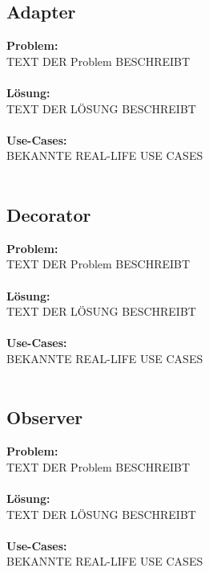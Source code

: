\documentclass[../main.tex]{subfiles}
\begin{document}
	\subsection{Adapter}
	\textbf{Problem:}\\
	TEXT DER Problem BESCHREIBT\\\\
	\textbf{Lösung:}\\
	TEXT DER LÖSUNG BESCHREIBT\\\\
	\textbf{Use-Cases:}\\
	BEKANNTE REAL-LIFE USE CASES\\\\
	\clearpage
	
	\subsection{Decorator}
	\textbf{Problem:}\\
	TEXT DER Problem BESCHREIBT\\\\
	\textbf{Lösung:}\\
	TEXT DER LÖSUNG BESCHREIBT\\\\
	\textbf{Use-Cases:}\\
	BEKANNTE REAL-LIFE USE CASES\\\\
	\clearpage	
	
	\subsection{Observer}
	\textbf{Problem:}\\
	TEXT DER Problem BESCHREIBT\\\\
	\textbf{Lösung:}\\
	TEXT DER LÖSUNG BESCHREIBT\\\\
	\textbf{Use-Cases:}\\
	BEKANNTE REAL-LIFE USE CASES\\\\
	\clearpage
	
\end{document}
